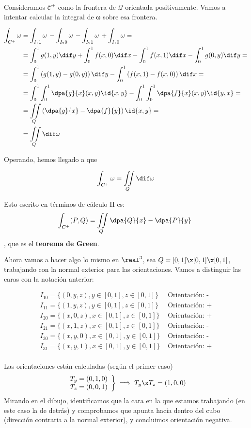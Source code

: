 Consideramos $\mathcal{C}^+$ como la frontera de $\mathcal{Q}$ orientada positivamente. Vamos a intentar calcular la integral de ω sobre esa frontera.

\begin{align*}
\int_{C^+} \omega &= \int_{I_11}\omega\, - \int_{I_20}\omega\, - \int_{I_21}\omega\, + \int_{I_10}\omega = \\
	&= \int_0^1 g(1,y)\dif y + \int_0^1 f(x,0)\dif x - \int_0^1f(x,1)\dif x - \int_0^1 g(0,y)\dif y = \\
	&= \int_0^1 \left(g(1,y)-g(0,y)\right) \dif y - \int_0^1 \left( f(x,1)-f(x,0)\right) \dif x = \\
	&= \int_0^1\int_0^1 \dpa{g}{x}(x,y)\id{x,y} - \int_0^1\int_0^1 \dpa{f}{x}(x,y)\id{y,x} = \\
	&= \iint\limits_Q\left( \dpa{g}{x} - \dpa{f}{y}\right)\id{x,y} = \\
	&= \iint\limits_Q \dif \omega
\end{align*}

Operando, hemos llegado a que

\[ \int_{C^{+}} \omega = \iint\limits_Q \dif \omega \]

Esto escrito en términos de cálculo II es: \[ \int_{C^{+}}(P,Q) = \iint\limits_Q \dpa{Q}{x} - \dpa{P}{y} \], que es el \textbf{teorema de Green}.

Ahora vamos a hacer algo lo mismo en $\real^3$, sea $Q=[0,1]\x[0,1]\x[0,1]$, trabajando con la normal exterior para las orientaciones. Vamos a distinguir las caras con la notación anterior:

\[\begin{array}{cc}
I_{10} = \{(0,y,z), y\in[0,1],z\in[0,1]\} & \text{ Orientación: -} \\
I_{11} = \{(1,y,z), y\in[0,1],z\in[0,1]\} & \text{ Orientación: +} \\
I_{20} = \{(x,0,z), x\in[0,1],z\in[0,1]\} & \text{ Orientación: +} \\
I_{21} = \{(x,1,z), x\in[0,1],z\in[0,1]\} & \text{ Orientación: -} \\
I_{30} = \{(x,y,0), x\in[0,1],y\in[0,1]\} & \text{ Orientación: -} \\
I_{31} = \{(x,y,1), x\in[0,1],y\in[0,1]\} & \text{ Orientación: +} \\
\end{array}
\]

Las orientaciones están calculadas (según el primer caso) \[\left.\begin{array}{cc}
T_y = (0,1,0)\\T_z=(0,0,1)\end{array}\right\}\implies T_y\x T_z = (1,0,0)\] Mirando en el dibujo, identificamos que la cara en la que estamos trabajando (en este caso la de detrás) y comprobamos que apunta hacia dentro del cubo (dirección contraria a la normal exterior), y concluimos orientación negativa.


